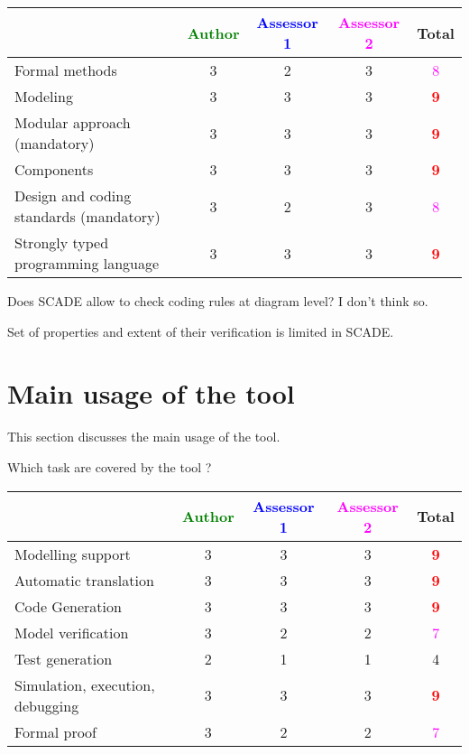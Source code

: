 \begin{tabular}{|l | c | c | c | c|}
\hline
& \textcolor{green}{Author} & \textcolor{blue}{Assessor 1} & \textcolor{magenta}{Assessor 2} & Total \\
\hline
Formal methods  & 3     & 2     &3 & \textcolor{magenta}{8} \\
\hline 
Modeling  & 3     & 3     &3 & \textcolor{red}{\textbf{9}} \\
\hline
Modular approach (mandatory) & 3     & 3     &3 & \textcolor{red}{\textbf{9}} \\
\hline
Components & 3     & 3     &3 & \textcolor{red}{\textbf{9}} \\
\hline
Design and coding standards (mandatory) & 3     & 2     &3 & \textcolor{magenta}{8} \\
\hline
Strongly typed programming language & 3     & 3     &3 & \textcolor{red}{\textbf{9}} \\
\hline
\end{tabular}

\begin{assessor1}
  Does SCADE allow to check coding rules at diagram level? I don't
  think so.

  Set of properties and extent of their verification is limited in
  SCADE.
\end{assessor1}



\section{Main usage of the tool}
\label{main_usage}

This section discusses the main usage of the tool.

Which task are covered by the tool ?


\begin{tabular}{|l | c | c | c | c|}
\hline
& \textcolor{green}{Author} & \textcolor{blue}{Assessor 1} & \textcolor{magenta}{Assessor 2} & Total \\
\hline 
Modelling support & 3     & 3     &3 & \textcolor{red}{\textbf{9}} \\
\hline
Automatic translation  & 3     & 3     &3 & \textcolor{red}{\textbf{9}} \\
\hline
Code Generation  & 3     & 3     &3 & \textcolor{red}{\textbf{9}} \\
\hline
Model verification & 3     & 2     &2 & \textcolor{magenta}{7} \\
\hline
Test generation & 2     & 1     &1 & 4     \\
\hline
Simulation, execution, debugging & 3     & 3     &3 & \textcolor{red}{\textbf{9}} \\
\hline
Formal proof & 3     & 2     &2 & \textcolor{magenta}{7} \\
\hline
\end{tabular}

